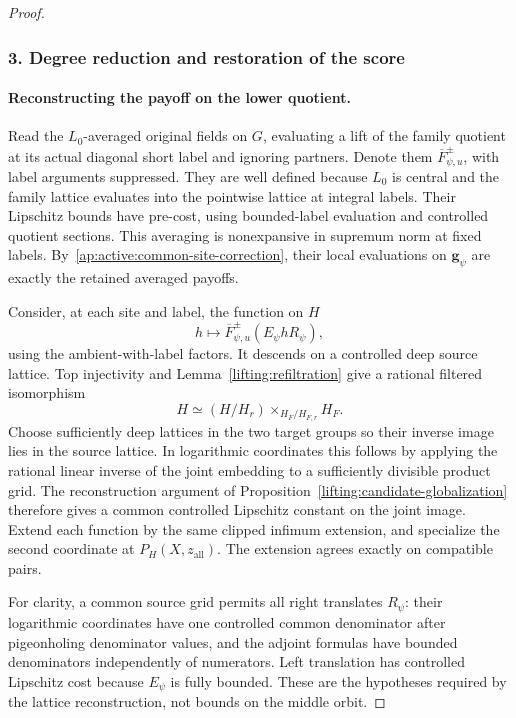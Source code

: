 \begin{proof}
\subsubsection*{3. Degree reduction and restoration of the score}

\paragraph{Reconstructing the payoff on the lower quotient.}

Read the $L_0$-averaged original fields on $G$, evaluating a lift of
the family quotient at its actual diagonal short label and ignoring
partners.  Denote them $\overline F^{\pm}_{\psi,u}$, with label
arguments suppressed.  They are well defined because $L_0$ is
central and the family lattice evaluates into the pointwise lattice
at integral labels.  Their Lipschitz bounds have pre-cost, using
bounded-label evaluation and controlled quotient sections.  This
averaging is nonexpansive in supremum norm at fixed labels.
By~\eqref{ap:active:common-site-correction}, their local evaluations
on $\mathbf g_\psi$ are exactly the retained averaged payoffs.

Consider, at each site and label, the function on $H$
\[
       h\longmapsto
       \overline F^{\pm}_{\psi,u}(E_\psi hR_\psi),
\]
using the ambient-with-label factors.  It descends on a controlled
deep source lattice.  Top injectivity and
Lemma~\ref{lifting:refiltration} give a rational filtered isomorphism
\begin{equation}
 H\simeq (H/H_r)\mathop{\times}_{H_F/H_{F,r}}H_F.
 \label{ap:active:fiber}
\end{equation}
Choose sufficiently deep lattices in the two target groups so
their inverse image lies in the source lattice.  In logarithmic
coordinates this follows by applying the rational linear inverse
of the joint embedding to a sufficiently divisible product grid.
The reconstruction argument of
Proposition~\ref{lifting:candidate-globalization} therefore gives
a common controlled Lipschitz constant on the joint image.  Extend
each function by the same clipped infimum extension, and specialize
the second coordinate at $P_H(X,z_{\mathrm{all}})$.
The extension agrees exactly on compatible pairs.

For clarity, a common source grid permits all right translates
$R_\psi$: their logarithmic coordinates have one controlled common
denominator after pigeonholing denominator values, and the adjoint
formulas have bounded denominators independently of numerators.
Left translation has controlled Lipschitz cost because $E_\psi$
is fully bounded.  These are the hypotheses required by the
lattice reconstruction, not bounds on the middle orbit.


\end{proof}
